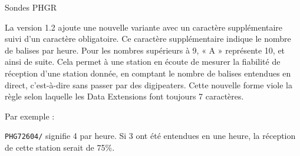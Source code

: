 \begin{aprssideblock}{Sondes PHGR}
\label{phgr-probes}
La version 1.2 ajoute une nouvelle variante avec un caractère
supplémentaire suivi d'un caractère \lit{/} obligatoire. Ce caractère
supplémentaire indique le nombre de balises par heure. Pour les nombres
supérieurs à 9, « A » représente 10, et ainsi de suite. Cela permet à
une station en écoute de mesurer la fiabilité de réception d'une station
donnée, en comptant le nombre de balises entendues en direct,
c'est-à-dire sans passer par des digipeaters. Cette nouvelle forme viole
la règle selon laquelle les Data Extensions font toujours 7 caractères.

Par exemple :

\begin{aprsexample}
\texttt{PHG72604/} \exgap signifie 4 par heure. Si 3 ont été entendues en
une heure, la réception de cette station serait de 75\%.
\end{aprsexample}
\end{aprssideblock}

